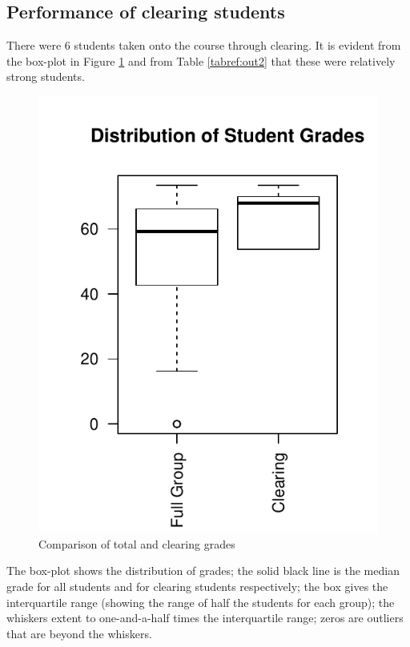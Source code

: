 \documentclass[12pt, a4paper, oneside]{article}\usepackage[]{graphicx}\usepackage[]{color}
\makeatletter
\def\maxwidth{ %
  \ifdim\Gin@nat@width>\linewidth
    \linewidth
  \else
    \Gin@nat@width
  \fi
}
\newenvironment{knitrout}{}{} %
\makeatother
\begin{document}
\subsection*{Performance of clearing students}
There were 6 students taken  onto the course through clearing.  It is evident from the box-plot in Figure \ref{fig:boxplot1} and from Table \ref{tabref:out2} that these were relatively strong students.   

\begin{knitrout}
\color{fgcolor}\begin{figure}[!h]

\includegraphics[width=\maxwidth]{figure/boxplot1} \caption[Comparison of total and clearing grades]{Comparison of total and clearing grades\label{fig:boxplot1}}
\end{figure}


\end{knitrout}
The box-plot shows the distribution of grades; the solid black line is the median grade for all students and for clearing students respectively; the box gives the interquartile range (showing the range of half the students for each group); the whiskers extent to one-and-a-half times the interquartile range; zeros are outliers that are beyond the whiskers. 
\end{document}
